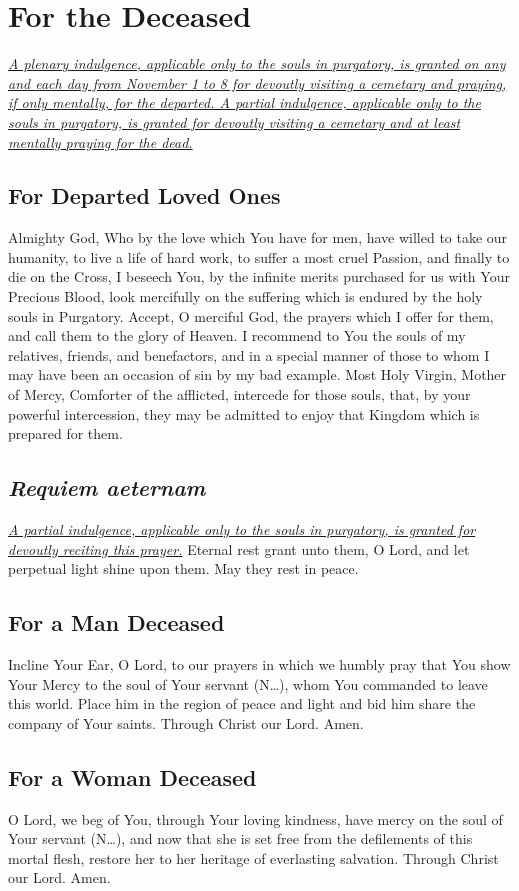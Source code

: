 \documentclass[12pt]{article}
\newcommand{\prayersection}[1]{\section{#1}}
\newcommand{\prayertitle}[1]{\subsection{#1}}
\newcommand{\insertname}{(N\dots)\xspace}
\newcommand{\emphasis}[1]{\emph{#1}}
\newcommand{\emphasis}[1]{\textsl{#1}}
\newcommand{\foreign}[1]{\emphasis{#1}}
\newcommand{\note}[1]{{\small{\emphasis{#1}}}\newline}
\newcommand{\linkednote}[2]{\hyperlink{#1}{\note{#2}}}
\begin{document}
\prayersection{For the Deceased}
\linkednote{grant29}{A plenary indulgence, applicable only to the souls in purgatory, is granted on any and each day from November 1 to 8 for devoutly visiting a cemetary and praying, if only mentally, for the departed.
A partial indulgence, applicable only to the souls in purgatory, is granted for devoutly visiting a cemetary and at least mentally praying for the dead.}
\prayertitle{For Departed Loved Ones}
Almighty God, Who by the love which You have for men, have willed to take our humanity, to live a life of hard work, to suffer a most cruel Passion, and finally to die on the Cross, I beseech You, by the infinite merits purchased for us with Your Precious Blood, look mercifully on the suffering  which is endured by the holy souls in Purgatory. 
Accept, O merciful God, the prayers which I offer for them, and call them to the glory of Heaven. 
I recommend to You the souls of my relatives, friends, and benefactors, and in a special manner of those to whom I may have been an occasion of sin by my bad example. 
Most Holy Virgin, Mother of Mercy, Comforter of the afflicted, intercede for those souls, that, by your powerful intercession, they may be admitted to enjoy that Kingdom which is prepared for them.

\prayertitle{\foreign{Requiem aeternam}}
\linkednote{grant29}{A partial indulgence, applicable only to the souls in purgatory, is granted for devoutly reciting this prayer.}
Eternal rest grant unto them, O Lord, and let perpetual light shine upon them.
May they rest in peace.

\prayertitle{For a Man Deceased}
Incline Your Ear, O Lord, to our prayers in which we humbly pray that You show Your Mercy to the soul of Your servant \insertname, whom You commanded to leave this world.
Place him in the region of peace and light and bid him share the company of Your saints.
Through Christ our Lord. Amen.

\prayertitle{For a Woman Deceased}
O Lord, we beg of You, through Your loving kindness, have mercy on the soul of Your servant \insertname, and now that she is set free from the defilements of this mortal flesh, restore her to her heritage of everlasting salvation.
Through Christ our Lord. Amen.
\end{document}
